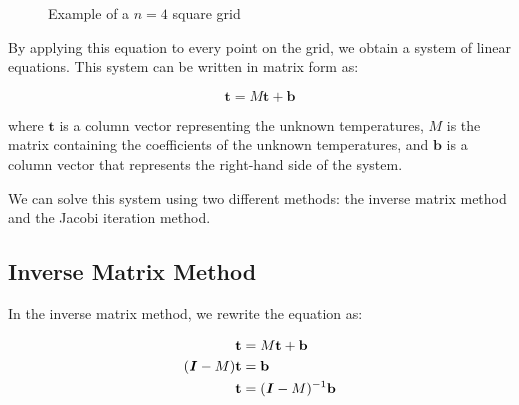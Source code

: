 \documentclass{article}
\begin{document}
\begin{multicols}{2}
\begin{figure}[H]
  \begin{center}
  \end{center}
  \caption{Example of a $n=4$ square grid}
\end{figure}


By applying this equation to every point on the grid, we obtain a system of linear equations. This system can be written in matrix form as:

\begin{equation}
  \textbf{t} = M \textbf{t} + \textbf{b}
\end{equation}

where $\textbf{t}$ is a column vector representing the unknown temperatures, $M$ is the matrix containing the coefficients of the unknown temperatures, and $\textbf{b}$ is a column vector that represents the right-hand side of the system.

We can solve this system using two different methods: the inverse matrix method and the Jacobi iteration method.

\subsection{Inverse Matrix Method}
In the inverse matrix method, we rewrite the equation as:

\begin{align}
  \textbf{t} &= M \textbf{t} + \textbf{b} \\
  (\textbf{\textit{I}} - M)\textbf{t} &= \textbf{b} \\
  \textbf{t} &= (\textbf{\textit{I}} - M)^{-1} \textbf{b}
\end{align}


\end{multicols}
\end{document}
